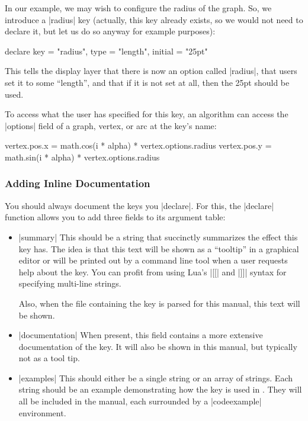 In our example, we may wish to configure the radius of the graph. So, we
introduce a |radius| key (actually, this key already exists, so we would not
need to declare it, but let us do so anyway for example purposes):
%
\begin{codeexample}[code only, tikz syntax=false]
declare {
  key = "radius",
  type = "length",
  initial = "25pt"
}
\end{codeexample}

This tells the display layer that there is now an option called |radius|, that
users set it to some ``length'', and that if it is not set at all, then the
25pt should be used.

To access what the user has specified for this key, an algorithm can access the
|options| field of a graph, vertex, or arc at the key's name:
%
\begin{codeexample}[code only, tikz syntax=false]
          vertex.pos.x = math.cos(i * alpha) * vertex.options.radius
          vertex.pos.y = math.sin(i * alpha) * vertex.options.radius
\end{codeexample}


\subsubsection{Adding Inline Documentation}

You should always document the keys you |declare|. For this, the |declare|
function allows you to add three fields to its argument table:
%
\begin{itemize}
    \item |summary| This should be a string that succinctly summarizes the
        effect this key has. The idea is that this text will be shown as a
        ``tooltip'' in a graphical editor or will be printed out by a command
        line tool when a user requests help about the key. You can profit from
        using Lua's |[[| and |]]| syntax for specifying multi-line strings.

        Also, when the file containing the key is parsed for this manual, this
        text will be shown.
    \item |documentation| When present, this field contains a more extensive
        documentation of the key. It will also be shown in this manual, but
        typically not as a tool tip.
    \item |examples| This should either be a single string or an array of
        strings. Each string should be an example demonstrating how the key is
        used in \tikzname. They will all be included in the manual, each
        surrounded by a |codeexample| environment.
\end{itemize}

